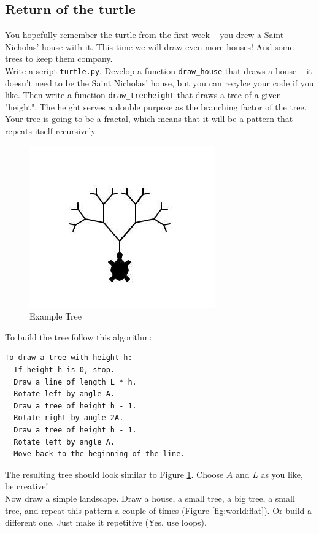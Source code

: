 \subsection{Return of the turtle}
\FloatBarrier
You hopefully remember the turtle from the first week -- you drew a Saint Nicholas' house with it.
This time we will draw even more houses! And some trees to keep them company.\\
Write a script \texttt{turtle.py}. Develop a function \texttt{draw\_house} that draws a house --
it doesn't need to be the Saint Nicholas' house, but you can recylce your code if you like.
Then write a function \texttt{draw\_tree{height}} that draws a tree of a given "height".
The height serves a double purpose as the branching factor of the tree. Your tree is going to be a fractal,
which means that it will be a pattern that repeats itself recursively.

\begin{figure}[h]
  \includegraphics[scale=0.8]{recursive_tree}
  \caption{Example Tree}
  \label{fig:tree:1}
\end{figure}


\noindent To build the tree follow this algorithm:\\
\begin{lstlisting}
To draw a tree with height h:
  If height h is 0, stop.
  Draw a line of length L * h.
  Rotate left by angle A.
  Draw a tree of height h - 1.
  Rotate right by angle 2A.
  Draw a tree of height h - 1.
  Rotate left by angle A.
  Move back to the beginning of the line.
\end{lstlisting}

\noindent The resulting tree should look similar to Figure \ref{fig:tree:1}. Choose $A$ and $L$ as you like, be creative!\\
Now draw a simple landscape. Draw a house, a small tree, a big tree, a small tree, and repeat this pattern a couple of times
(Figure \ref{fig:world:flat}). Or build a different one. Just make it repetitive (Yes, use loops).

